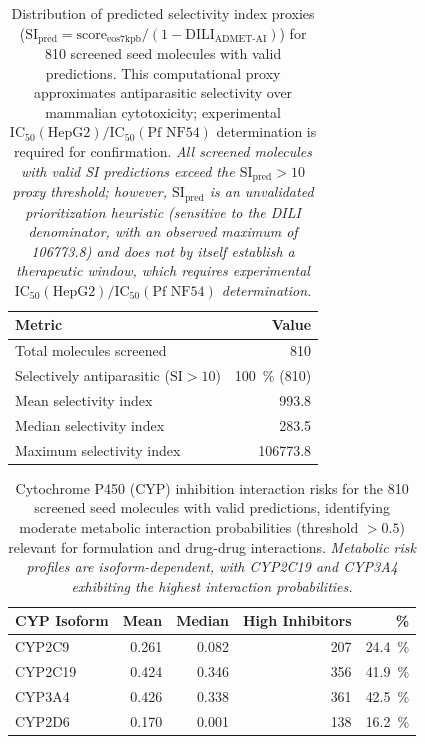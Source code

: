 \documentclass[journal=jcisd8,manuscript=suppinfo]{achemso}
\begin{document}
\begin{table}[!htbp]
\centering
\caption{Distribution of predicted selectivity index proxies ($\text{SI}_{\text{pred}} = \text{score}_{\text{eos7kpb}} / (1 - \text{DILI}_{\text{ADMET-AI}})$) for \num{810} screened seed molecules with valid predictions. This computational proxy approximates antiparasitic selectivity over mammalian cytotoxicity; experimental $\text{IC}_{50}(\text{HepG2}) / \text{IC}_{50}(\text{Pf NF54})$ determination is required for confirmation. \textit{All screened molecules with valid SI predictions exceed the $\text{SI}_{\text{pred}} > \num{10}$ proxy threshold; however, $\text{SI}_{\text{pred}}$ is an unvalidated prioritization heuristic (sensitive to the DILI denominator, with an observed maximum of \num{106773.8}) and does not by itself establish a therapeutic window, which requires experimental $\text{IC}_{50}(\text{HepG2}) / \text{IC}_{50}(\text{Pf NF54})$ determination.}}
\label{tab:selectivity}
\begin{tabular}{@{}l r@{}}
\toprule
\textbf{Metric} & \textbf{Value} \\
\midrule
Total molecules screened & \num{810} \\
Selectively antiparasitic ($\text{SI} > \num{10}$) & \qty{100}{\percent} (\num{810}) \\
Mean selectivity index & \num{993.8} \\
Median selectivity index & \num{283.5} \\
Maximum selectivity index & \num{106773.8} \\
\bottomrule
\end{tabular}
\end{table}

\begin{table}[!htbp]
\centering
\caption{Cytochrome P450 (CYP) inhibition interaction risks for the \num{810} screened seed molecules with valid predictions, identifying moderate metabolic interaction probabilities (threshold $> \num{0.5}$) relevant for formulation and drug-drug interactions. \textit{Metabolic risk profiles are isoform-dependent, with CYP2C19 and CYP3A4 exhibiting the highest interaction probabilities.}}
\label{tab:cyp450}
\begin{tabular}{@{}l r r r r@{}}
\toprule
\textbf{CYP Isoform} & \textbf{Mean} & \textbf{Median} & \textbf{High Inhibitors} & \textbf{\unit{\percent}} \\
\midrule
CYP2C9 & \num{0.261} & \num{0.082} & \num{207} & \qty{24.4}{\percent} \\
CYP2C19 & \num{0.424} & \num{0.346} & \num{356} & \qty{41.9}{\percent} \\
CYP3A4 & \num{0.426} & \num{0.338} & \num{361} & \qty{42.5}{\percent} \\
CYP2D6 & \num{0.170} & \num{0.001} & \num{138} & \qty{16.2}{\percent} \\
\bottomrule
\end{tabular}
\end{table}
\end{document}
